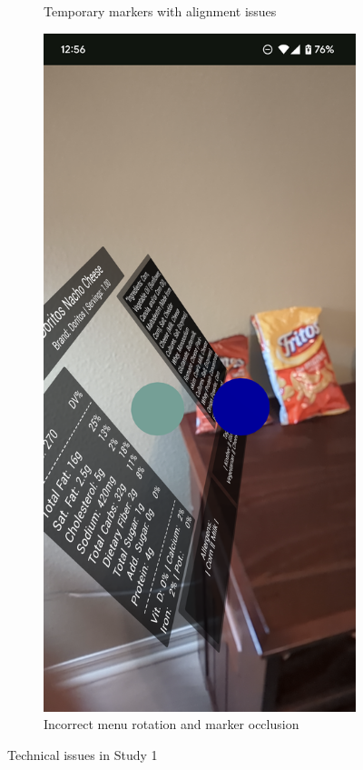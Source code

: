 \documentclass[thesis]{fputhesis}
\begin{document}
\begin{body}
\begin{figure}[h]
\begin{subfigure}[]{0.3\textwidth}
        \caption{Temporary markers with alignment issues}
        \label{fig:marker-alignment}
    \end{subfigure}
    \begin{subfigure}[]{0.3\textwidth}
        \centering
        \includegraphics[width=\linewidth]{Images/menurotation.png}
        \caption{Incorrect menu rotation and marker occlusion}
        \label{fig:menu-rotation}
    \end{subfigure}
    \caption{Technical issues in Study 1}
    \label{fig:ui-issues-v1}
\end{figure}

\end{body}
\end{document}
